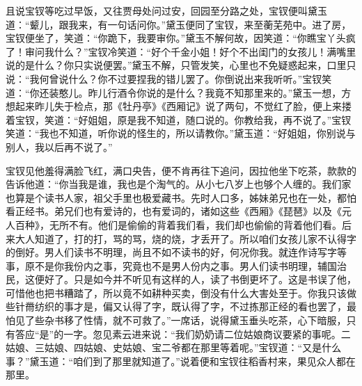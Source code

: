 \documentclass[12pt,oneside]{book}
\begin{document}
且说宝钗等吃过早饭，又往贾母处问过安，回园至分路之处，宝钗便叫黛玉道：“颦儿，跟我来，有一句话问你。”黛玉便同了宝钗，来至蘅芜苑中。进了房，宝钗便坐了，笑道：“你跪下，我要审你。”黛玉不解何故，因笑道：“你瞧宝丫头疯了！审问我什么？”宝钗冷笑道：“好个千金小姐！好个不出闺门的女孩儿！满嘴里说的是什么？你只实说便罢。”黛玉不解，只管发笑，心里也不免疑惑起来，口里只说：“我何曾说什么？你不过要捏我的错儿罢了。你倒说出来我听听。”宝钗笑道：“你还装憨儿。昨儿行酒令你说的是什么？我竟不知那里来的。”黛玉一想，方想起来昨儿失于检点，那《牡丹亭》《西厢记》说了两句，不觉红了脸，便上来搂着宝钗，笑道：“好姐姐，原是我不知道，随口说的。你教给我，再不说了。”宝钗笑道：“我也不知道，听你说的怪生的，所以请教你。”黛玉道：“好姐姐，你别说与别人，我以后再不说了。”

宝钗见他羞得满脸飞红，满口央告，便不肯再往下追问，因拉他坐下吃茶，款款的告诉他道：“你当我是谁，我也是个淘气的。从小七八岁上也够个人缠的。我们家也算是个读书人家，祖父手里也极爱藏书。先时人口多，姊妹弟兄也在一处，都怕看正经书。弟兄们也有爱诗的，也有爱词的，诸如这些《西厢》《琵琶》以及《元人百种》，无所不有。他们是偷偷的背着我们看，我们却也偷偷的背着他们看。后来大人知道了，打的打，骂的骂，烧的烧，才丢开了。所以咱们女孩儿家不认得字的倒好。男人们读书不明理，尚且不如不读书的好，何况你我。就连作诗写字等事，原不是你我份内之事，究竟也不是男人份内之事。男人们读书明理，辅国治民，这便好了。只是如今并不听见有这样的人，读了书倒更坏了。这是书误了他，可惜他也把书糟踏了，所以竟不如耕种买卖，倒没有什么大害处至于。你我只该做些针黹纺织的事才是，偏又认得了字，既认得了字，不过拣那正经的看也罢了，最怕见了些杂书移了性情，就不可救了。”一席话，说得黛玉垂头吃茶，心下暗服，只有答应“是”的一字。忽见素云进来说：“我们奶奶请二位姑娘商议要紧的事呢。二姑娘、三姑娘、四姑娘、史姑娘、宝二爷都在那里等着呢。”宝钗道：“又是什么事？”黛玉道：“咱们到了那里就知道了。”说着便和宝钗往稻香村来，果见众人都在那里。
\end{document}
